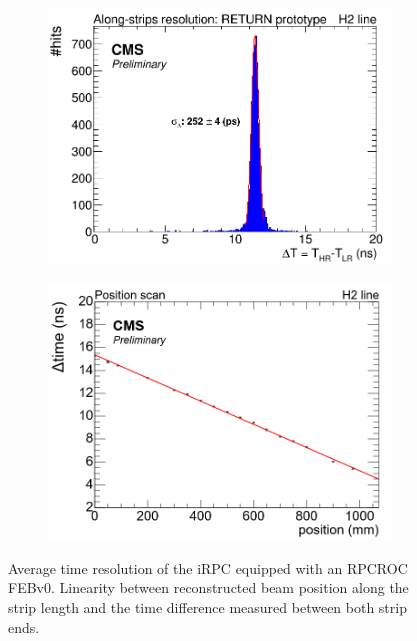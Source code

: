 	\begin{figure}[H]
		\begin{subfigure}{.5\linewidth}
		    \centering
			\includegraphics[width = \linewidth]{fig/chapt6/iRPC-RPCROC-TimeResolution.png}
			\caption{\label{fig:RPCROCv0_Res:A}}
		\end{subfigure}
		\begin{subfigure}{.5\linewidth}
		    \centering
			\includegraphics[width = \linewidth]{fig/chapt6/iRPC-RPCROC-Linearity.png}
			\caption{\label{fig:RPCROCv0_Res:B}}
		\end{subfigure}
		\caption{\label{fig:RPCROCv0_Res}  Average time resolution of the iRPC equipped with an RPCROC FEBv0.  Linearity between reconstructed beam position along the strip length and the time difference measured between both strip ends.}
    \end{figure}
		

